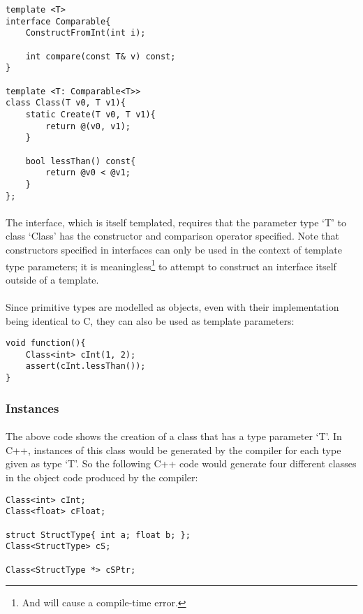 \documentclass[12pt,twoside,notitlepage]{report}
\begin{document}
\begin{lstlisting}
template <T>
interface Comparable{
	ConstructFromInt(int i);

	int compare(const T& v) const;
}

template <T: Comparable<T>>
class Class(T v0, T v1){
	static Create(T v0, T v1){
		return @(v0, v1);
	}

	bool lessThan() const{
		return @v0 < @v1;
	}
};
\end{lstlisting}


\paragraph{}
The interface, which is itself templated, requires that the parameter type `T' to class `Class' has the constructor and comparison operator specified. Note that constructors specified in interfaces can only be used in the context of template type parameters; it is meaningless\footnote{And will cause a compile-time error.} to attempt to construct an interface itself outside of a template.

\paragraph{}
Since primitive types are modelled as objects, even with their implementation being identical to C, they can also be used as template parameters:


\begin{lstlisting}
void function(){
	Class<int> cInt(1, 2);
	assert(cInt.lessThan());
}
\end{lstlisting}


\subsubsection{Instances}

\paragraph{}
The above code shows the creation of a class that has a type parameter `T'. In C++, instances of this class would be generated by the compiler for each type given as type `T'. So the following C++ code would generate four different classes in the object code produced by the compiler:


\begin{lstlisting}
Class<int> cInt;
Class<float> cFloat;

struct StructType{ int a; float b; };
Class<StructType> cS;

Class<StructType *> cSPtr;
\end{lstlisting}
\end{document}
